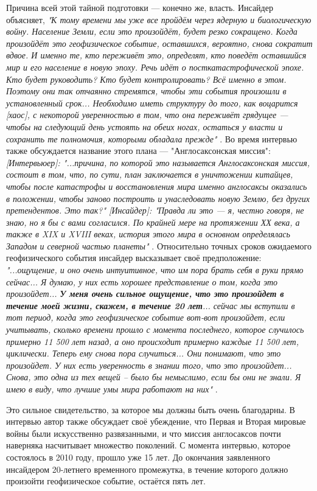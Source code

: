 \documentclass[10pt,twocolumn,letterpaper]{article}
\begin{document}
Причина всей этой тайной подготовки — конечно же, власть. Инсайдер объясняет, \textit{"К тому времени мы уже все пройдём через ядерную и биологическую войну. Население Земли, если это произойдёт, будет резко сокращено. Когда произойдёт это геофизическое событие, оставшихся, вероятно, снова сократит вдвое. И именно те, кто переживёт это, определят, кто поведёт оставшийся мир и его население в новую эпоху. Речь идёт о посткатастрофической эпохе. Кто будет руководить? Кто будет контролировать? Всё именно в этом. Поэтому они так отчаянно стремятся, чтобы эти события произошли в установленный срок... Необходимо иметь структуру до того, как воцарится [хаос], с некоторой уверенностью в том, что она переживёт грядущее — чтобы на следующий день устоять на обеих ногах, остаться у власти и сохранить те полномочия, которыми обладала прежде"} \cite{4}. Во время интервью также обсуждается название этого плана — "Англосаксонская миссия": \textit{[Интервьюер]: "...причина, по которой это называется Англосаксонская миссия, состоит в том, что, по сути, план заключается в уничтожении китайцев, чтобы после катастрофы и восстановления мира именно англосаксы оказались в положении, чтобы заново построить и унаследовать новую Землю, без других претендентов. Это так?" [Инсайдер]: "Правда ли это — я, честно говоря, не знаю, но я бы с вами согласился. По крайней мере на протяжении ХХ века, а также в XIX и XVIII веках, история этого мира в основном определялась Западом и северной частью планеты"} \cite{4}.
Относительно точных сроков ожидаемого геофизического события инсайдер высказывает своё предположение: \textit{"...ощущение, и оно очень интуитивное, что им пора брать себя в руки прямо сейчас... Я думаю, у них есть хорошее представление о том, когда это произойдет... \textbf{У меня очень сильное ощущение, что это произойдет в течение моей жизни, скажем, в течение 20 лет}... сейчас мы вступили в тот период, когда это геофизическое событие вот-вот произойдет, если учитывать, сколько времени прошло с момента последнего, которое случилось примерно 11 500 лет назад, а оно происходит примерно каждые 11 500 лет, циклически. Теперь ему снова пора случиться... Они понимают, что это произойдет. У них есть уверенность в знании того, что это произойдет... Снова, это одна из тех вещей -- было бы немыслимо, если бы они не знали. Я имею в виду, что лучшие умы мира работают на них"} \cite{4}.

Это сильное свидетельство, за которое мы должны быть очень благодарны. В интервью автор также обсуждает своё убеждение, что Первая и Вторая мировые войны были искусственно развязанными, и что миссия англосаксов почти наверняка насчитывает множество поколений. С момента интервью, которое состоялось в 2010 году, прошло уже 15 лет. До окончания заявленного инсайдером 20-летнего временного промежутка, в течение которого должно произойти геофизическое событие, остаётся пять лет.
\end{document}

